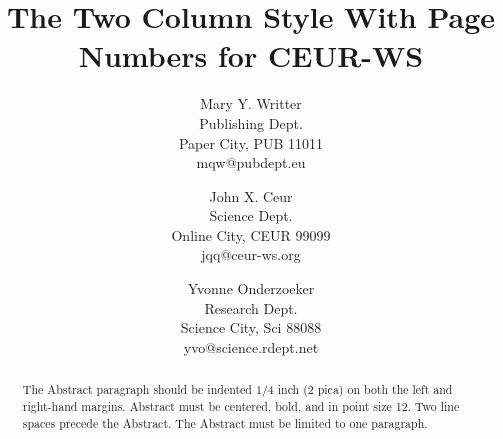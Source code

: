 \documentclass[a4paper]{article}
\title{The Two Column Style With Page Numbers for CEUR-WS}
\author{
Mary Y. Writter \\ Publishing Dept.\\
                Paper City, PUB 11011 \\ mqw@pubdept.eu
\and
John X. Ceur \\ Science Dept.\\
                Online City, CEUR 99099 \\ jqq@ceur-ws.org
\and
Yvonne Onderzoeker \\ Research Dept.\\
                Science City, Sci 88088 \\ yvo@science.rdept.net
}
\begin{document}
\maketitle

\begin{abstract}
The Abstract paragraph should be indented $1/4$ inch (2 pica) on both
the left and right-hand margins. Abstract must be centered, bold, and
in point size 12. Two line spaces precede the Abstract. The Abstract
must be limited to one paragraph.
\end{abstract}









 


\end{document}
